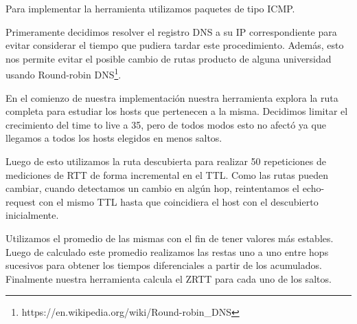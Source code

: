 Para implementar la herramienta utilizamos paquetes de tipo ICMP.

Primeramente decidimos resolver el registro DNS a su IP correspondiente para evitar considerar el tiempo que pudiera tardar este procedimiento. Además, esto nos permite evitar el posible cambio de rutas producto de alguna universidad usando Round-robin DNS\footnote{https://en.wikipedia.org/wiki/Round-robin_DNS}.

En el comienzo de nuestra implementación nuestra herramienta explora la ruta completa para estudiar los hosts que pertenecen a la misma.
Decidimos limitar el crecimiento del time to live a 35, pero de todos modos esto no afectó ya que llegamos a todos los hosts elegidos en menos saltos.

Luego de esto utilizamos la ruta descubierta para realizar 50 repeticiones de mediciones de RTT de forma incremental en el TTL.
Como las rutas pueden cambiar, cuando detectamos un cambio en algún hop, reintentamos el echo-request con el mismo TTL hasta que coincidiera el host con el descubierto inicialmente.

Utilizamos el promedio de las mismas con el fin de tener valores más estables.
Luego de calculado este promedio realizamos las restas uno a uno entre hops sucesivos para obtener los tiempos diferenciales a partir de los acumulados.
Finalmente nuestra herramienta calcula el ZRTT para cada uno de los saltos.
